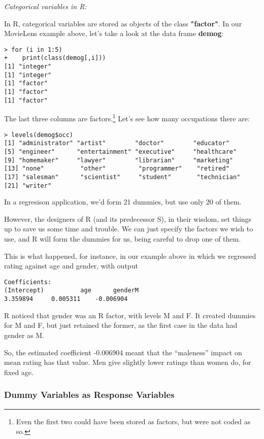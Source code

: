 \textit{Categorical variables in R:}

In R, categorical variables are stored as objects of the class
\textbf{"factor"}.  In our MovieLens example above, let's take a look at
the data frame \textbf{demog}:

\begin{lstlisting}
> for (i in 1:5) 
+    print(class(demog[,i]))
[1] "integer"
[1] "integer"
[1] "factor"
[1] "factor"
[1] "factor"
\end{lstlisting}

The last three columns are factors.\footnote{Even the first two could
have been stored as factors, but were not coded as so.}  Let's see how
many occupations there are:

\begin{lstlisting}
> levels(demog$occ)
[1] "administrator" "artist"        "doctor"        "educator"     
[5] "engineer"      "entertainment" "executive"     "healthcare"   
[9] "homemaker"     "lawyer"        "librarian"     "marketing"    
[13] "none"          "other"         "programmer"    "retired"      
[17] "salesman"      "scientist"     "student"       "technician"   
[21] "writer"       
\end{lstlisting}

In a regresison application, we'd form 21 dummies, but use only 20 of
them.

However, the designers of R (and its predecessor S), in their wisdom,
set things up to save us some time and trouble.  We can just specify the
factors we wish to use, and R will form the dummies for us, being
careful to drop one of them.

This is what happened, for instance, in our example above in which we
regressed rating against age and gender, with output

\begin{lstlisting}
Coefficients:
(Intercept)          age      genderM  
3.359894     0.005311    -0.006904  
\end{lstlisting}

R noticed that gender was an R factor, with levels M and F.  It created
dummies for M and F, but just retained the former, as the first case in
the data had gender as M.

So, the estimated coefficient -0.006904 meant that the ``maleness''
impact on mean rating has that value.  Men give slightly lower
ratings than women do, for fixed age.

\subsubsection{Dummy Variables as Response Variables}

